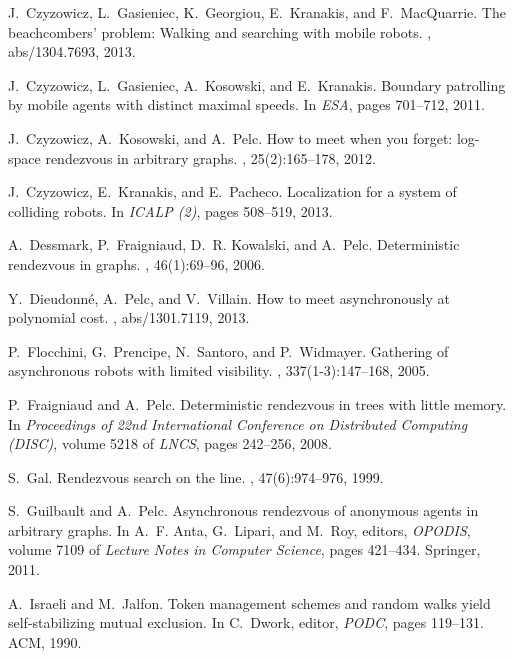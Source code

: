 \documentclass{llncs}
\begin{document}
\begin{thebibliography}{10}
J.~Czyzowicz, L.~Gasieniec, K.~Georgiou, E.~Kranakis, and F.~MacQuarrie.
\newblock The beachcombers' problem: Walking and searching with mobile robots.
, abs/1304.7693, 2013.

J.~Czyzowicz, L.~Gasieniec, A.~Kosowski, and E.~Kranakis.
\newblock Boundary patrolling by mobile agents with distinct maximal speeds.
\newblock In {\em ESA}, pages 701--712, 2011.

J.~Czyzowicz, A.~Kosowski, and A.~Pelc.
\newblock How to meet when you forget: log-space rendezvous in arbitrary
  graphs.
, 25(2):165--178, 2012.

J.~Czyzowicz, E.~Kranakis, and E.~Pacheco.
\newblock Localization for a system of colliding robots.
\newblock In {\em ICALP (2)}, pages 508--519, 2013.

A.~Dessmark, P.~Fraigniaud, D.~R. Kowalski, and A.~Pelc.
\newblock Deterministic rendezvous in graphs.
, 46(1):69--96, 2006.

Y.~Dieudonn{\'e}, A.~Pelc, and V.~Villain.
\newblock How to meet asynchronously at polynomial cost.
, abs/1301.7119, 2013.

P.~Flocchini, G.~Prencipe, N.~Santoro, and P.~Widmayer.
\newblock Gathering of asynchronous robots with limited visibility.
, 337(1-3):147--168, 2005.

P.~Fraigniaud and A.~Pelc.
\newblock Deterministic rendezvous in trees with little memory.
\newblock In {\em Proceedings of 22nd International Conference on Distributed
  Computing ({DISC})}, volume 5218 of {\em LNCS}, pages 242--256, 2008.

S.~Gal.
\newblock Rendezvous search on the line.
, 47(6):974--976, 1999.

S.~Guilbault and A.~Pelc.
\newblock Asynchronous rendezvous of anonymous agents in arbitrary graphs.
\newblock In A.~F. Anta, G.~Lipari, and M.~Roy, editors, {\em OPODIS}, volume
  7109 of {\em Lecture Notes in Computer Science}, pages 421--434. Springer,
  2011.

A.~Israeli and M.~Jalfon.
\newblock Token management schemes and random walks yield self-stabilizing
  mutual exclusion.
\newblock In C.~Dwork, editor, {\em PODC}, pages 119--131. ACM, 1990.


\end{thebibliography}
\end{document}
